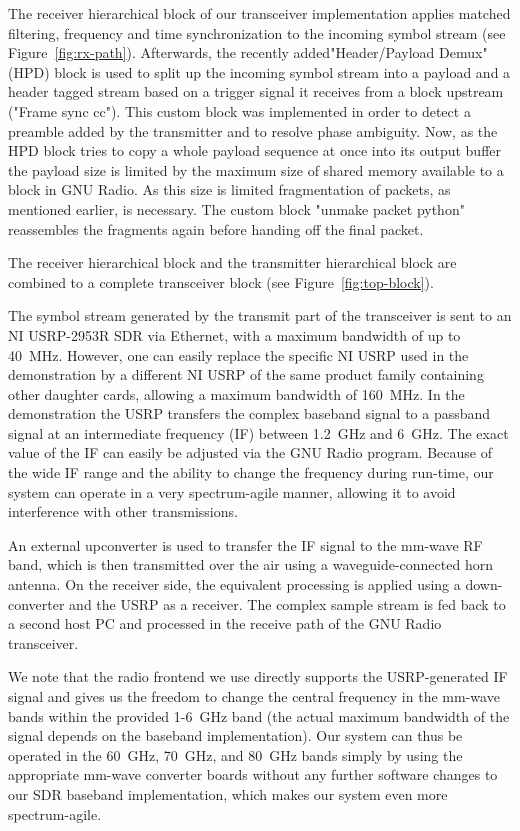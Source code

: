 \documentclass{sig-alternate}
\begin{document}
The receiver hierarchical block of our transceiver implementation applies matched filtering, frequency and time synchronization to the incoming symbol stream (see Figure~\ref{fig:rx-path}). Afterwards, the recently added\linebreak "Header/Payload Demux" (HPD) block is used to split up the incoming symbol stream into a payload and a header tagged stream based on a trigger signal it receives from a block upstream ("Frame sync cc"). This custom block was implemented in order to detect a preamble added by the transmitter and to resolve phase ambiguity. Now, as the HPD block tries to copy a whole payload sequence at once into its output buffer the payload size is limited by the maximum size of shared memory available to a block in GNU Radio. As this size is limited fragmentation of packets, as mentioned earlier, is necessary. The custom block "unmake packet python" reassembles the fragments again before handing off the final packet.

The receiver hierarchical block and the transmitter hierarchical block are combined to a complete transceiver block (see Figure~\ref{fig:top-block}).
 
 The symbol stream generated by the transmit part of the transceiver is sent to an NI USRP-2953R \cite{ettus} SDR via Ethernet, with a maximum bandwidth of up to 40~MHz. However, one can easily replace the specific NI USRP used in the demonstration by a different NI USRP of the same product family containing other daughter cards, allowing a maximum bandwidth of 160~MHz. In the demonstration the USRP transfers the complex baseband signal to a passband signal at an intermediate frequency (IF) between 1.2~GHz and 6~GHz. The exact value of the IF can easily be adjusted via the GNU Radio program. Because of the wide IF range and the ability to change the frequency during run-time, our system can operate in a very spectrum-agile manner, allowing it to avoid interference with other transmissions.

An external upconverter \cite{siversima} is used to transfer the IF signal to the mm-wave RF band, which is then transmitted over the air using a waveguide-connected horn antenna. On the receiver side, the equivalent  processing is applied using a down-converter and the USRP as a receiver. The complex sample stream is fed back to a second host PC and processed in the receive path of the GNU Radio transceiver.

We note that the radio frontend we use directly supports the USRP-generated IF signal and gives us the freedom to change the central frequency in the mm-wave bands within the provided 1-6~GHz band (the actual maximum bandwidth of the signal depends on the baseband implementation).  Our system can thus be operated in the 60~GHz, 70~GHz, and 80~GHz bands simply by using the appropriate mm-wave converter boards without any further software changes to our SDR baseband implementation, which makes our system even more spectrum-agile.
\end{document}

